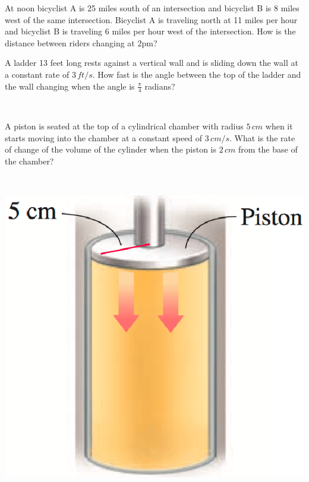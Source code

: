 \documentclass[answers]{exam}
\begin{document}
\begin{ex*}
  At noon bicyclist A is 25 miles south of an intersection and bicyclist B is 8 miles west of the same intersection. Bicyclist A is traveling north at 11 miles per hour and bicyclist B is traveling 6 miles per hour west of the intersection. How is the distance between riders changing at 2pm?
\end{ex*}
\pagebreak

\begin{ex*}
  A ladder 13 feet long rests against a vertical wall and is sliding down the wall at a constant rate of $3\,ft/s$. How fast is the angle between the top of the ladder and the wall changing when the angle is $\frac{\pi}{4}$ radians?
\end{ex*}
\pagebreak

\noindent
\begin{minipage}[t]{0.7\linewidth}~
  \begin{ex*}
    A piston is seated at the top of a cylindrical chamber with radius $5\,cm$ when it starts moving into the chamber at a constant speed of $3\,cm/s$. What is the rate of change of the volume of the cylinder when the piston is $2\,cm$ from the base of the chamber?
  \end{ex*}
\end{minipage}%
\begin{minipage}[t]{0.3\linewidth}~
  \begin{flushright}
    \includegraphics[width=0.9\linewidth]{images/briggs_03_11/piston.png}
  \end{flushright}
\end{minipage}
\pagebreak
\end{document}
